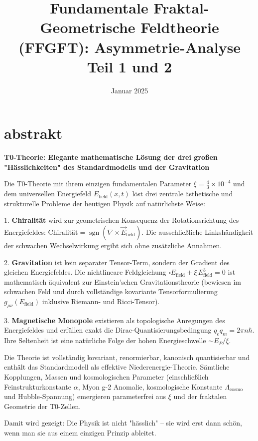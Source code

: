 \documentclass[11pt,oneside]{book}
\title{Fundamentale Fraktal-Geometrische Feldtheorie (FFGFT): Asymmetrie-Analyse\\[0.5em]
\large Teil 1 und 2}
\author{}
\date{Januar 2025}
\begin{document}
\frontmatter
\pagestyle{empty}

\maketitle
	\section{abstrakt}
	\noindent\textbf{T0-Theorie: Elegante mathematische Lösung der drei großen "Hässlichkeiten" des Standardmodells und der Gravitation}
	
	Die T0-Theorie mit ihrem einzigen fundamentalen Parameter $\xi = \frac{4}{3} \times 10^{-4}$ und dem universellen Energiefeld $E_{\text{field}}(x,t)$ löst drei zentrale ästhetische und strukturelle Probleme der heutigen Physik auf natürlichste Weise:
	
	1. \textbf{Chiralität} wird zur geometrischen Konsequenz der Rotationsrichtung des Energiefeldes:  
	$\text{Chiralität} = \operatorname{sgn}(\nabla \times \vec{E}_{\text{field}})$.  
	Die ausschließliche Linkshändigkeit der schwachen Wechselwirkung ergibt sich ohne zusätzliche Annahmen.
	
	2. \textbf{Gravitation} ist kein separater Tensor-Term, sondern der Gradient des gleichen Energiefeldes. Die nichtlineare Feldgleichung  
	$\square E_{\text{field}} + \xi \, E_{\text{field}}^3 = 0$  
	ist mathematisch äquivalent zur Einstein'schen Gravitationstheorie (bewiesen im schwachen Feld und durch vollständige kovariante Tensorformulierung $g_{\mu\nu}(E_{\text{field}})$ inklusive Riemann- und Ricci-Tensor).
	
	3. \textbf{Magnetische Monopole} existieren als topologische Anregungen des Energiefeldes und erfüllen exakt die Dirac-Quantisierungsbedingung $q_e q_m = 2\pi n \hbar$. Ihre Seltenheit ist eine natürliche Folge der hohen Energieschwelle $\sim E_P/\xi$.
	
	Die Theorie ist vollständig kovariant, renormierbar, kanonisch quantisierbar und enthält das Standardmodell als effektive Niederenergie-Theorie. Sämtliche Kopplungen, Massen und kosmologischen Parameter (einschließlich Feinstrukturkonstante $\alpha$, Myon g-2 Anomalie, kosmologische Konstante $\Lambda_{\text{cosmo}}$ und Hubble-Spannung) emergieren parameterfrei aus $\xi$ und der fraktalen Geometrie der T0-Zellen.
	
	Damit wird gezeigt: Die Physik ist nicht "hässlich" – sie wird erst dann schön, wenn man sie aus einem einzigen Prinzip ableitet.
\end{document}
